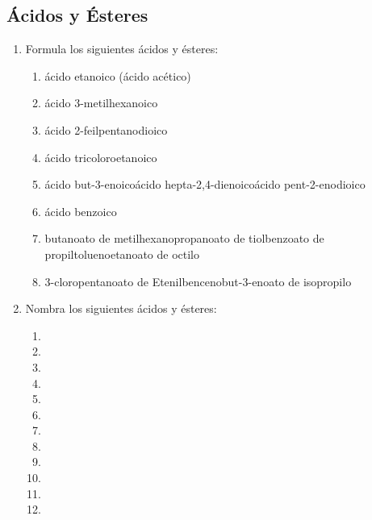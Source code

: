 \subsection*{Ácidos y Ésteres}

\begin{enumerate}
    \item Formula los siguientes ácidos y ésteres:
          \begin{enumerate}
              \item ácido etanoico (ácido acético)
              \item ácido 3-metilhexanoico
              \item ácido 2-feilpentanodioico
              \item ácido tricoloroetanoico
              \item ácido but-3-enoicoácido hepta-2,4-dienoicoácido pent-2-enodioico
              \item ácido benzoico
              \item butanoato de metilhexanopropanoato de tiolbenzoato de propiltoluenoetanoato de octilo
              \item 3-cloropentanoato de Etenilbencenobut-3-enoato de isopropilo
          \end{enumerate}
    \item Nombra los siguientes ácidos y ésteres:
          \begin{enumerate}
              \item {}
              \item {}
              \item {}
              \item {}
              \item {}
              \item {}
              \item {}
              \item {}
              \item {}
              \item {}
              \item {}
              \item {}
          \end{enumerate}
\end{enumerate}


